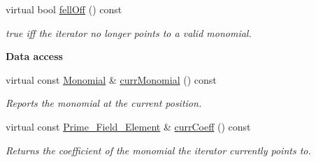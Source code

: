 \begin{Indent}
\begin{DoxyCompactItemize}
\mbox{\label{class_l_l_polynomial___iterator_aed442195d521dc796f86c1216223c022}} 
virtual bool \hyperlink{class_l_l_polynomial___iterator_aed442195d521dc796f86c1216223c022}{fell\+Off} () const
\begin{DoxyCompactList}\small\item\em true iff the iterator no longer points to a valid monomial. \end{DoxyCompactList}\end{DoxyCompactItemize}
\end{Indent}
\begin{Indent}\textbf{ Data access}\par
\begin{DoxyCompactItemize}
\item 
\mbox{\label{class_l_l_polynomial___iterator_ac94220e6d3a51d2706366d0f55784647}} 
virtual const \hyperlink{class_monomial}{Monomial} \& \hyperlink{class_l_l_polynomial___iterator_ac94220e6d3a51d2706366d0f55784647}{curr\+Monomial} () const
\begin{DoxyCompactList}\small\item\em Reports the monomial at the current position. \end{DoxyCompactList}\item 
\mbox{\label{class_l_l_polynomial___iterator_a515fcd5357ddd5eeac273598039ff00a}} 
virtual const \hyperlink{class_prime___field___element}{Prime\+\_\+\+Field\+\_\+\+Element} \& \hyperlink{class_l_l_polynomial___iterator_a515fcd5357ddd5eeac273598039ff00a}{curr\+Coeff} () const
\begin{DoxyCompactList}\small\item\em Returns the coefficient of the monomial the iterator currently points to. \end{DoxyCompactList}\end{DoxyCompactItemize}
\end{Indent}
